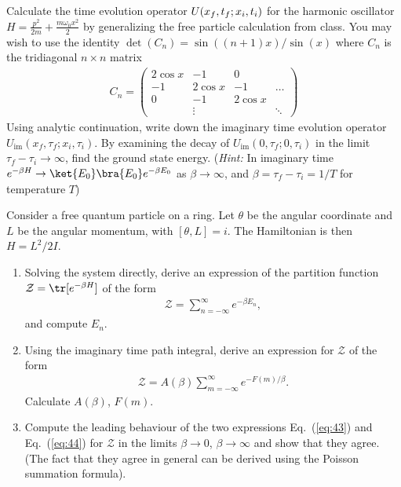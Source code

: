 \documentclass{jhwhw}
\begin{document}
Calculate the time evolution operator $U(x_f,t_f;x_i,t_i)$ for the harmonic oscillator $H=\frac {p^2}{2m} + \frac{m\omega_0 x^2}2$ by generalizing the free particle calculation from class. You may wish to use the identity $\det(C_n)=\sin((n+1)x)/\sin(x)$ where $C_n$ is the tridiagonal $n\times n$ matrix
\begin{align}
  \label{eq:26}
C_n =
\begin{pmatrix}
  2\cos x & -1 & 0 &  \\
  -1 & 2 \cos x & -1 & \ldots \\
 0 & -1 & 2 \cos x &  \\
 & \vdots & & \ddots
\end{pmatrix}
\end{align}
Using analytic continuation, write down the imaginary time evolution operator $U_{\text{im}}(x_f,\tau_f;x_i,\tau_i)$. By examining the decay of $U_{\text{im}}(0,\tau_f; 0, \tau_i)$ in the limit $\tau_f - \tau_i \rightarrow \infty$, find the ground state energy.
(\emph{Hint:} In imaginary time $e^{-\beta H} \rightarrow \ket{E_{0}}\bra{E_{0}} e^{-\beta E_{0}}$ as $\beta\rightarrow \infty$, and $\beta = \tau_{f} -\tau_{i} = 1/T$ for temperature $T$)



Consider a free quantum particle on a ring. Let $\theta$ be the angular coordinate and $L$ be the angular momentum, with $[\theta,L]=i$. The Hamiltonian is then $H=L^2/2I$.
\begin{enumerate}
\item Solving the system directly, derive an expression of the partition function $\mathcal Z=\tr [e^{-\beta H}]$ of the form
  \begin{align}
    \mathcal Z = \sum_{n=-\infty}^\infty e^{-\beta E_n},\label{eq:43}
  \end{align}
and compute $E_n$.
\item Using the imaginary time path integral, derive an expression for $\mathcal Z$ of the form
  \begin{align}
    \mathcal Z = A(\beta) \sum_{m=-\infty}^\infty e^{-F(m)/\beta}\label{eq:44}.
  \end{align}
Calculate $A(\beta)$, $F(m)$.
\item Compute the leading behaviour of the two expressions Eq.~(\ref{eq:43}) and Eq.~(\ref{eq:44}) for $\mathcal Z$ in the limits $\beta\rightarrow 0$, $\beta \rightarrow \infty$ and show that they agree. (The fact that they agree in general can be derived using the Poisson summation formula).
\end{enumerate}
\end{document}
